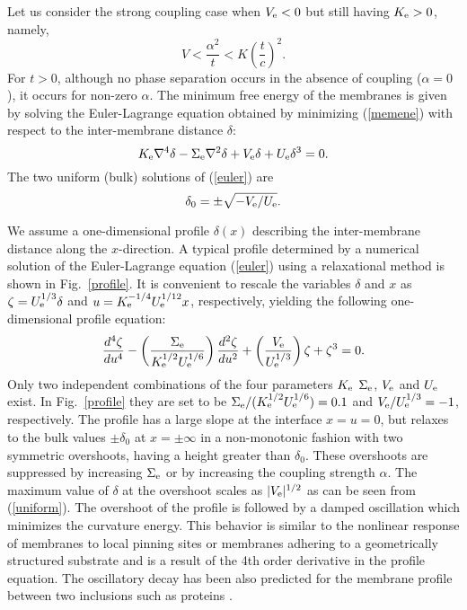 Let us consider the strong coupling case when ${V}_{\rm e}<0$ but
still having ${K}_{\rm e}>0$, namely,
\begin{equation}
V < \frac{\alpha^2}{t}< K\left(\frac{t}{c}\right)^2.
\end{equation}
For $t>0$, although no phase separation occurs
in the absence of coupling ($\alpha=0$), it occurs
for non-zero $\alpha$.
The minimum free energy of the membranes is given by solving
the Euler-Lagrange equation obtained by minimizing (\ref{memene})
with respect to the inter-membrane distance $\delta$:
%
\begin{equation}
{K}_{\rm e} \nabla^4 \delta - {\Sigma}_{\rm e} \nabla^2 \delta
+{V}_{\rm e} \delta + {U}_{\rm e} \delta^3 = 0.
\label{euler}
\end{equation}
%
The two uniform (bulk) solutions of (\ref{euler}) are
%
\begin{equation}
\delta_0 = \pm \sqrt{-{V}_{\rm e}/{U}_{\rm e}}.
\label{uniform}
\end{equation}


We assume a one-dimensional profile $\delta(x)$ describing the
inter-membrane distance along the $x$-direction.
A typical profile determined by a numerical solution of the
Euler-Lagrange equation (\ref{euler}) using a relaxational method
is shown in Fig.\ \ref{profile}.
It is convenient to rescale the variables $\delta$ and $x$  as
$\zeta = {U}_{\rm e}^{1/3} \delta$ and
$u = {K}_{\rm e}^{-1/4} {U}_{\rm e}^{1/12} x$, respectively, 
yielding the following one-dimensional profile equation:
\begin{equation}
\frac{d^4 \zeta}{d u^4} -
\left(
\frac{{\Sigma}_{\rm e}}{{K}_{\rm e}^{1/2} {U}_{\rm e}^{1/6}}
\right)
\frac{d^2 \zeta}{d u^2}+
\left(
\frac{{V}_{\rm e}}{{U}_{\rm e}^{1/3}} \right)
\zeta + \zeta^3 = 0.
\end{equation}
Only two  independent combinations of the
four parameters $K_{\rm e}$ $\Sigma_{\rm e}$, $V_{\rm e}$
and $U_{\rm e}$ exist. In Fig.\ \ref{profile} they are set to be
${\Sigma}_{\rm e}/({K}_{\rm e}^{1/2} {U}_{\rm e}^{1/6})=0.1$ and
${V}_{\rm e}/{U}_{\rm e}^{1/3}=-1$, respectively.
The profile has a large slope at the interface $x=u=0$, but
relaxes to the bulk values $\pm \delta_0$ at $x = \pm \infty$
in a non-monotonic fashion with two symmetric overshoots,
having a height greater than $\delta_0$.
These overshoots are suppressed by increasing ${\Sigma}_{\rm e}$
or by increasing the coupling strength $\alpha$.
The maximum value of $\delta$ at the overshoot scales as
$\vert {V}_{\rm e} \vert^{1/2}$ as can be seen from (\ref{uniform}).
The overshoot of the profile is followed by a damped oscillation
which minimizes the curvature energy.
This behavior is similar to the nonlinear response of membranes to
local pinning sites \cite{BMMS,MS,MSK} or membranes adhering to
a geometrically structured substrate \cite{SA} and is a result
of the 4th order derivative in the profile equation.
The oscillatory decay has been also predicted for the membrane profile
between two inclusions such as proteins
\cite{DPS,DBPS,ABDPS,Netz}.


